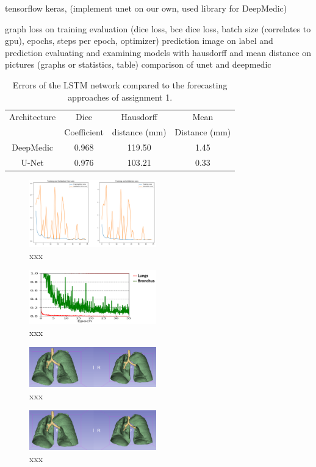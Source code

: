 
tensorflow keras, (implement unet on our own, used library for DeepMedic)

graph loss on training evaluation (dice loss, bce dice loss, batch size (correlates to gpu), epochs, steps per epoch, optimizer)
prediction
image on label and prediction 
evaluating and examining models with hausdorff and mean distance on pictures (graphs or statistics, table)
comparison of unet and deepmedic

\begin{table}[h!]
	\centering
	\setlength{\tabcolsep}{10pt}
	\renewcommand{\arraystretch}{1.5}
	\begin{tabular}{c c c c}
		\hline 
		Architecture & Dice & Hausdorff & Mean \\ 
		& Coefficient & distance (mm) & Distance (mm) \\ 
		\hline 
		DeepMedic & 0.968 & 119.50 & 1.45 \\ 
		U-Net & 0.976 & 103.21 & 0.33 \\ 
		\hline 
	\end{tabular}
	\caption{Errors of the LSTM network compared to the forecasting approaches of assignment 1.}
	\label{table_result}
\end{table}


\begin{figure}[h!]
	\includegraphics[width=0.49\textwidth, angle=0]{files/jpgunettrain.png}
	\caption{xxx}
	\label{scan_picture}
\end{figure}

\begin{figure}[h!]
	\includegraphics[width=0.49\textwidth, angle=0]{files/deepmedictrain.png}
	\caption{xxx}
	\label{scan_picture}
\end{figure}

\begin{figure}[h!]
	\includegraphics[width=0.49\textwidth, angle=0]{files/preddeepmedic.png}
	\caption{xxx}
	\label{scan_picture}
\end{figure}

\begin{figure}[h!]
	\includegraphics[width=0.49\textwidth, angle=0]{files/predunet.png}
	\caption{xxx}
	\label{scan_picture}
\end{figure}